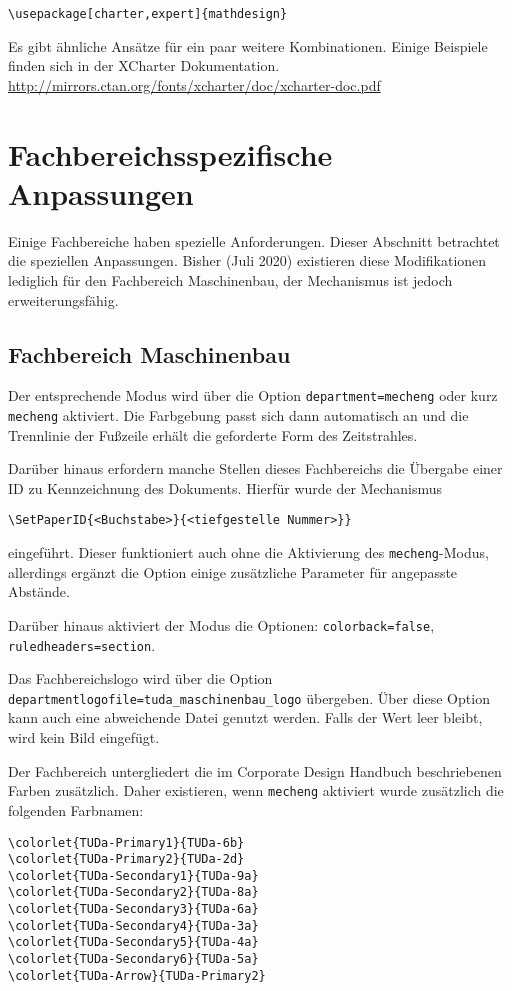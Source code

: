 \documentclass[
	german,%
	accentcolor=9c,%
]{tudapub}
\newcommand*{\code}[1]{\texttt{#1}}
\begin{document}
\begin{verbatim}
\usepackage[charter,expert]{mathdesign}
\end{verbatim}

Es gibt ähnliche Ansätze für ein paar weitere Kombinationen. Einige Beispiele finden sich in der XCharter Dokumentation. \url{http://mirrors.ctan.org/fonts/xcharter/doc/xcharter-doc.pdf}

\section{Fachbereichsspezifische Anpassungen}
Einige Fachbereiche haben spezielle Anforderungen. Dieser Abschnitt betrachtet die speziellen Anpassungen. Bisher (Juli 2020) existieren diese Modifikationen lediglich für den Fachbereich Maschinenbau, der Mechanismus ist jedoch erweiterungsfähig.

\subsection{Fachbereich Maschinenbau}
Der entsprechende Modus wird über die Option \code{department=mecheng} oder kurz \code{mecheng} aktiviert. Die Farbgebung passt sich dann automatisch an und die Trennlinie der Fußzeile erhält die geforderte Form des Zeitstrahles.

Darüber hinaus erfordern manche Stellen dieses Fachbereichs die Übergabe einer ID zu Kennzeichnung des Dokuments. Hierfür wurde der Mechanismus
\begin{verbatim}
\SetPaperID{<Buchstabe>}{<tiefgestelle Nummer>}}
\end{verbatim}
eingeführt.
Dieser funktioniert auch ohne die Aktivierung des \code{mecheng}-Modus, allerdings ergänzt die Option einige zusätzliche Parameter für angepasste Abstände.

Darüber hinaus aktiviert der Modus die Optionen:
\code{colorback=false}, \code{ruledheaders=section}.

Das Fachbereichslogo wird über die Option \verb+departmentlogofile=tuda_maschinenbau_logo+ übergeben. Über diese Option kann auch eine abweichende Datei genutzt werden. Falls der Wert leer bleibt, wird kein Bild eingefügt.

Der Fachbereich untergliedert die im Corporate Design Handbuch beschriebenen Farben zusätzlich. Daher existieren, wenn \code{mecheng} aktiviert wurde zusätzlich die folgenden Farbnamen:

\begin{verbatim}
\colorlet{TUDa-Primary1}{TUDa-6b}
\colorlet{TUDa-Primary2}{TUDa-2d}
\colorlet{TUDa-Secondary1}{TUDa-9a}
\colorlet{TUDa-Secondary2}{TUDa-8a}
\colorlet{TUDa-Secondary3}{TUDa-6a}
\colorlet{TUDa-Secondary4}{TUDa-3a}
\colorlet{TUDa-Secondary5}{TUDa-4a}
\colorlet{TUDa-Secondary6}{TUDa-5a}
\colorlet{TUDa-Arrow}{TUDa-Primary2}
\end{verbatim}
\end{document}
